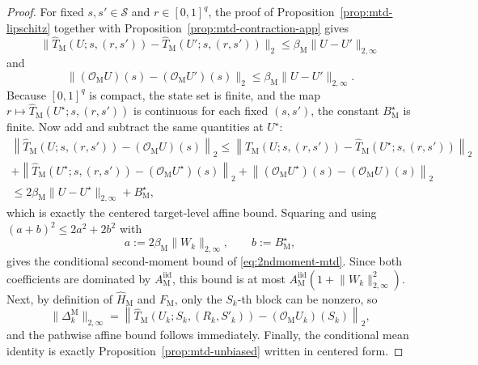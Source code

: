 \documentclass{article}
\newcommand{\X}{\mathcal{S}}
\begin{document}
\begin{proof}
For fixed $s,s'\in\X$ and $r\in[0,1]^q$, the proof of Proposition~\ref{prop:mtd-lipschitz} together with Proposition~\ref{prop:mtd-contraction-app} gives
\begin{equation}
\lVert \widehat T_{\mathrm M}(U;s,(r,s'))-\widehat T_{\mathrm M}(U';s,(r,s')) \rVert_2 \le \beta_{\mathrm M}\lVert U-U'\rVert_{2,\infty}
\end{equation}
and
\begin{equation}
\lVert (\mathcal O_{\mathrm M}U)(s)-(\mathcal O_{\mathrm M}U')(s) \rVert_2 \le \beta_{\mathrm M}\lVert U-U'\rVert_{2,\infty}.
\end{equation}
Because $[0,1]^q$ is compact, the state set is finite, and the map $r \mapsto \widehat T_{\mathrm M}(U^\star;s,(r,s'))$ is continuous for each fixed $(s,s')$, the constant $B_{\mathrm M}^\star$ is finite. Now add and subtract the same quantities at $U^\star$:
\begin{equation}
\begin{gathered}
\left\lVert \widehat T_{\mathrm M}(U;s,(r,s'))-(\mathcal O_{\mathrm M}U)(s) \right\rVert_2 \le \left\lVert \widehat T_{\mathrm M}(U;s,(r,s'))-\widehat T_{\mathrm M}(U^\star;s,(r,s')) \right\rVert_2 \\
+ \left\lVert \widehat T_{\mathrm M}(U^\star;s,(r,s'))-(\mathcal O_{\mathrm M}U^\star)(s) \right\rVert_2+ \left\lVert (\mathcal O_{\mathrm M}U^\star)(s)-(\mathcal O_{\mathrm M}U)(s) \right\rVert_2\\ 
\le 2\beta_{\mathrm M}\lVert U-U^\star \rVert_{2,\infty}+B_{\mathrm M}^\star,
\end{gathered}
\end{equation}
which is exactly the centered target-level affine bound. Squaring and using $(a+b)^2\le 2a^2+2b^2$ with
\begin{equation}
a:=2\beta_{\mathrm M}\lVert W_k \rVert_{2,\infty}, \qquad b:=B_{\mathrm M}^\star,
\end{equation}
gives the conditional second-moment bound of \eqref{eq:2ndmoment-mtd}. Since both coefficients are dominated by $A_{\mathrm M}^{\mathrm{iid}}$, this bound is at most $A_{\mathrm M}^{\mathrm{iid}}(1+\lVert W_k\rVert_{2,\infty}^2)$. Next, by definition of $\widehat H_{\mathrm M}$ and $F_{\mathrm M}$, only the $S_k$-th block can be nonzero, so
\begin{equation}
\lVert \Delta_k^{\mathrm M} \rVert_{2,\infty} = \left\lVert \widehat T_{\mathrm M}(U_k;S_k,(R_k,S'_k))-(\mathcal O_{\mathrm M}U_k)(S_k) \right\rVert_2,
\end{equation}
and the pathwise affine bound follows immediately. Finally, the conditional mean identity is exactly Proposition~\ref{prop:mtd-unbiased} written in centered form.
\end{proof}
\end{document}
